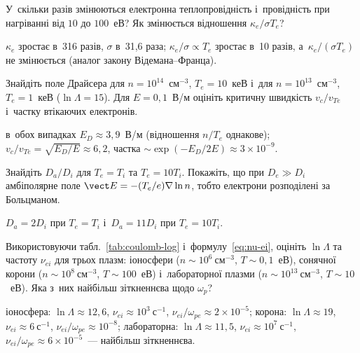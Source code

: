 \begin{problem}\label{prb:PlasmaThermal}
	У~скільки разів змінюються електронна теплопровідність і~провідність при нагріванні
	від $10$ до $100$~еВ? Як змінюється відношення $\kappa_e/\sigma T_e$?
	\begin{solution}
		$\kappa_e$ зростає в~316 разів, $\sigma$ в~31,6 раза; $\kappa_e/\sigma\propto T_e$ зростає в~10 разів, а~$\kappa_e/(\sigma T_e)$ не змінюється
		(аналог закону Відемана--Франца).
	\end{solution}
\end{problem}

\begin{problem}\label{prb:Dreicer}
	Знайдіть поле Драйсера для $n=10^{14}$~см$^{-3}$, $T_e=10$~кеВ і~для $n=10^{13}$~см$^{-3}$, $T_e=1$~кеВ
	($\ln\Lambda=15$). Для $E=0{,}1$~В/м оцініть критичну швидкість $v_c/v_{Te}$ і~частку втікаючих електронів.
	\begin{solution}
		в~обох випадках $E_D\approx3{,}9$~В/м (відношення $n/T_e$ однакове);
	$v_c/v_{Te}=\sqrt{E_D/E}\approx6{,}2$, частка $\sim\exp(-E_D/2E)\approx3\times10^{-9}$.
	\end{solution}
\end{problem}

\begin{problem}\label{prb:PlasmaAmbipolar}
	Знайдіть $D_a/D_i$ для $T_e=T_i$ та $T_e=10T_i$. Покажіть, що при $D_e\gg D_i$
	амбіполярне поле $\vect E=-(T_e/e)\nabla\ln n$, тобто електрони
	розподілені за Больцманом.
	\begin{solution}
		$D_a=2D_i$ при $T_e=T_i$ і~$D_a=11D_i$ при $T_e=10T_i$.
	\end{solution}
\end{problem}

\begin{problem}\label{prb:LnLambdaPractice}
	Використовуючи табл.~\ref{tab:coulomb-log} і~формулу~\eqref{eq:nu-ei}, оцініть $\ln\Lambda$ та
	частоту $\nu_{ei}$ для трьох плазм: іоносфери ($n\sim10^{6}~\text{см}^{-3}$, $T\sim0{,}1$~еВ),
	сонячної корони ($n\sim10^{8}~\text{см}^{-3}$, $T\sim100$~еВ) і~лабораторної плазми
	($n\sim10^{13}~\text{см}^{-3}$, $T\sim10$~еВ). Яка з~них найбільш зіткненнєва щодо $\omega_p$?
	\begin{solution}
		іоносфера: $\ln\Lambda\approx12{,}6$, $\nu_{ei}\approx10^{3}~\mathrm{с}^{-1}$, $\nu_{ei}/\omega_{pe}\approx2\times10^{-5}$;
	корона: $\ln\Lambda\approx19$, $\nu_{ei}\approx6~\mathrm{с}^{-1}$, $\nu_{ei}/\omega_{pe}\approx10^{-8}$;
	лабораторна: $\ln\Lambda\approx11{,}5$, $\nu_{ei}\approx10^{7}~\mathrm{с}^{-1}$, $\nu_{ei}/\omega_{pe}\approx6\times10^{-5}$~--- найбільш зіткненнєва.
	\end{solution}
\end{problem}

